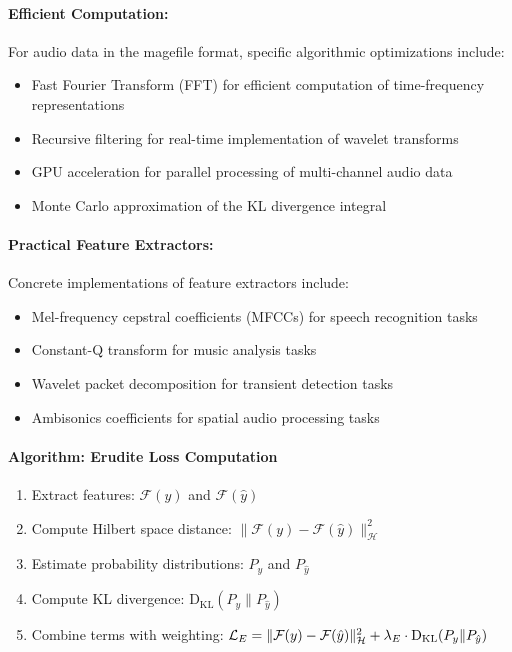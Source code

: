 \paragraph{Efficient Computation:}
For audio data in the magefile format, specific algorithmic optimizations include:

\begin{itemize}
\item Fast Fourier Transform (FFT) for efficient computation of time-frequency representations
\item Recursive filtering for real-time implementation of wavelet transforms
\item GPU acceleration for parallel processing of multi-channel audio data
\item Monte Carlo approximation of the KL divergence integral
\end{itemize}

\paragraph{Practical Feature Extractors:}
Concrete implementations of feature extractors include:
\begin{itemize}
\item Mel-frequency cepstral coefficients (MFCCs) for speech recognition tasks
\item Constant-Q transform for music analysis tasks
\item Wavelet packet decomposition for transient detection tasks
\item Ambisonics coefficients for spatial audio processing tasks
\end{itemize}

\paragraph{Algorithm: Erudite Loss Computation}
\begin{enumerate}
\item Extract features: $\mathcal{F}(y)$ and $\mathcal{F}(\hat{y})$
\item Compute Hilbert space distance: $\|\mathcal{F}(y) - \mathcal{F}(\hat{y})\|_{\mathcal{H}}^2$
\item Estimate probability distributions: $P_y$ and $P_{\hat{y}}$
\item Compute KL divergence: $\mathrm{D_{KL}}(P_y \| P_{\hat{y}})$
\item Combine terms with weighting: $\mathcal{L}_E = \|\mathcal{F}(y) - \mathcal{F}(\hat{y})\|_{\mathcal{H}}^2 + \lambda_E \cdot \mathrm{D_{KL}}(P_y \| P_{\hat{y}})$
\end{enumerate}

